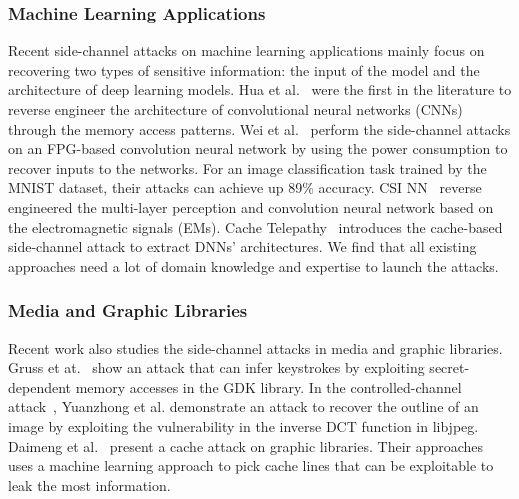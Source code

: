 \subsubsection*{Machine Learning Applications}
Recent side-channel attacks on machine learning applications mainly focus on recovering two types of sensitive information: the input of the model and the architecture of deep learning models. Hua et al.~\cite{hua2018reverse} were the first in the literature to reverse engineer the architecture of convolutional neural networks (CNNs) through the memory access patterns. Wei et al.~\cite{wei2018know} perform the side-channel attacks on an FPG-based convolution neural network by using the power consumption to recover inputs to the networks. For an image classification task trained by the MNIST dataset, their attacks can achieve up 89\% accuracy. CSI NN~\cite{batina2019csi} reverse engineered the multi-layer perception and convolution neural network based on the electromagnetic signals (EMs). Cache Telepathy~\cite{yan2020cache} introduces the cache-based side-channel attack to extract DNNs' architectures. We find that all existing approaches need a lot of domain knowledge and expertise to launch the attacks.
\subsubsection*{Media and Graphic Libraries}
Recent work also studies the side-channel attacks in media and graphic libraries. Gruss et at.~\cite{191010} show an attack that can infer keystrokes by exploiting secret-dependent memory accesses in the GDK library. In the controlled-channel attack~\cite{xu2015controlled}, Yuanzhong et al. demonstrate an attack to recover the outline of an image by exploiting the vulnerability in the inverse DCT function in libjpeg. Daimeng et al.~\cite{wang2019unveiling} present a cache attack on graphic libraries. Their approaches uses a machine learning approach to pick cache lines that can be exploitable to leak the most information.
